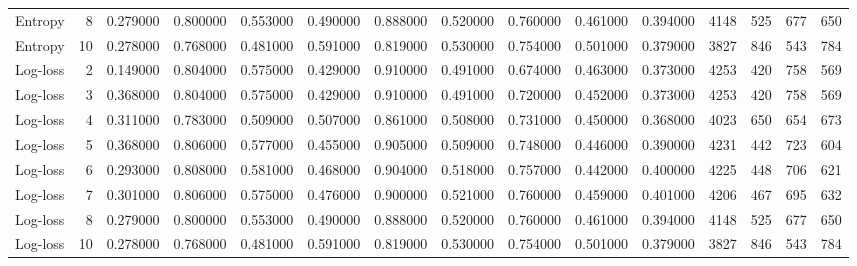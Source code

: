 \begin{tabular}{lrrrrrrrrrrrrrr}
Entropy & 8 & 0.279000 & 0.800000 & 0.553000 & 0.490000 & 0.888000 & 0.520000 & 0.760000 & 0.461000 & 0.394000 & 4148 & 525 & 677 & 650 \\
Entropy & 10 & 0.278000 & 0.768000 & 0.481000 & 0.591000 & 0.819000 & 0.530000 & 0.754000 & 0.501000 & 0.379000 & 3827 & 846 & 543 & 784 \\
Log-loss & 2 & 0.149000 & 0.804000 & 0.575000 & 0.429000 & 0.910000 & 0.491000 & 0.674000 & 0.463000 & 0.373000 & 4253 & 420 & 758 & 569 \\
Log-loss & 3 & 0.368000 & 0.804000 & 0.575000 & 0.429000 & 0.910000 & 0.491000 & 0.720000 & 0.452000 & 0.373000 & 4253 & 420 & 758 & 569 \\
Log-loss & 4 & 0.311000 & 0.783000 & 0.509000 & 0.507000 & 0.861000 & 0.508000 & 0.731000 & 0.450000 & 0.368000 & 4023 & 650 & 654 & 673 \\
Log-loss & 5 & 0.368000 & 0.806000 & 0.577000 & 0.455000 & 0.905000 & 0.509000 & 0.748000 & 0.446000 & 0.390000 & 4231 & 442 & 723 & 604 \\
Log-loss & 6 & 0.293000 & 0.808000 & 0.581000 & 0.468000 & 0.904000 & 0.518000 & 0.757000 & 0.442000 & 0.400000 & 4225 & 448 & 706 & 621 \\
Log-loss & 7 & 0.301000 & 0.806000 & 0.575000 & 0.476000 & 0.900000 & 0.521000 & 0.760000 & 0.459000 & 0.401000 & 4206 & 467 & 695 & 632 \\
Log-loss & 8 & 0.279000 & 0.800000 & 0.553000 & 0.490000 & 0.888000 & 0.520000 & 0.760000 & 0.461000 & 0.394000 & 4148 & 525 & 677 & 650 \\
Log-loss & 10 & 0.278000 & 0.768000 & 0.481000 & 0.591000 & 0.819000 & 0.530000 & 0.754000 & 0.501000 & 0.379000 & 3827 & 846 & 543 & 784 \\
\bottomrule
\end{tabular}
